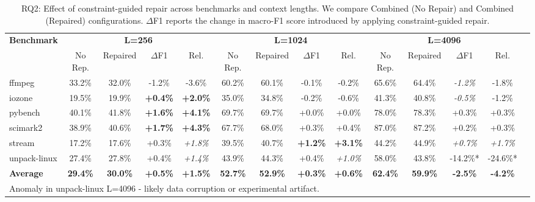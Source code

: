 \begin{table}[t]
\centering
\caption{RQ2: Effect of constraint-guided repair across benchmarks and context lengths. We compare Combined (No Repair) and Combined (Repaired) configurations. $\Delta$F1 reports the change in macro-F1 score introduced by applying constraint-guided repair.}
\label{tab:rq2}
\footnotesize
\setlength{\tabcolsep}{4pt}
\begin{tabular}{@{}lccccccccccccc@{}}
\toprule
\multirow{2}{*}{\textbf{Benchmark}} & \multicolumn{4}{c}{\textbf{L=256}} & \multicolumn{4}{c}{\textbf{L=1024}} & \multicolumn{4}{c}{\textbf{L=4096}} \\
\cmidrule(lr){2-5} \cmidrule(lr){6-9} \cmidrule(lr){10-13}
& No Rep. & Repaired & $\Delta$F1 & Rel. & No Rep. & Repaired & $\Delta$F1 & Rel. & No Rep. & Repaired & $\Delta$F1 & Rel. \\
\midrule
ffmpeg       & 33.2\% & 32.0\% & -1.2\% & -3.6\% & 60.2\% & 60.1\% & -0.1\% & -0.2\% & 65.6\% & 64.4\% & \textit{-1.2\%} & -1.8\% \\
iozone       & 19.5\% & 19.9\% & \textbf{+0.4\%} & \textbf{+2.0\%} & 35.0\% & 34.8\% & -0.2\% & -0.6\% & 41.3\% & 40.8\% & \textit{-0.5\%} & -1.2\% \\
pybench      & 40.1\% & 41.8\% & \textbf{+1.6\%} & \textbf{+4.1\%} & 69.7\% & 69.7\% & +0.0\% & +0.0\% & 78.0\% & 78.3\% & +0.3\% & +0.3\% \\
scimark2     & 38.9\% & 40.6\% & \textbf{+1.7\%} & \textbf{+4.3\%} & 67.7\% & 68.0\% & +0.3\% & +0.4\% & 87.0\% & 87.2\% & +0.2\% & +0.3\% \\
stream       & 17.2\% & 17.6\% & +0.3\% & \textit{+1.8\%} & 39.5\% & 40.7\% & \textbf{+1.2\%} & \textbf{+3.1\%} & 44.2\% & 44.9\% & \textit{+0.7\%} & \textit{+1.7\%} \\
unpack-linux & 27.4\% & 27.8\% & +0.4\% & \textit{+1.4\%} & 43.9\% & 44.3\% & +0.4\% & \textit{+1.0\%} & 58.0\% & 43.8\% & -14.2\%* & -24.6\%* \\
\midrule
\textbf{Average} & \textbf{29.4\%} & \textbf{30.0\%} & \textbf{+0.5\%} & \textbf{+1.5\%} & \textbf{52.7\%} & \textbf{52.9\%} & \textbf{+0.3\%} & \textbf{+0.6\%} & \textbf{62.4\%} & \textbf{59.9\%} & \textbf{-2.5\%} & \textbf{-4.2\%} \\
\bottomrule
\multicolumn{13}{l}{\footnotesize *Anomaly in unpack-linux L=4096 - likely data corruption or experimental artifact.} \\
\end{tabular}
\end{table}



